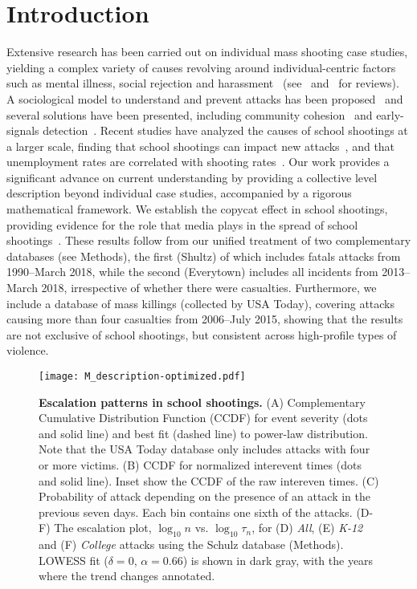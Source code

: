 \section*{Introduction}
Extensive research has been carried out on individual mass shooting
case studies, yielding a complex variety of causes revolving around
individual-centric factors such as mental illness, social rejection
and harassment~\cite{Newman2004,Flannery2013,Kimmel2003,Leary2003}
(see~\cite{Muschert2006} and~\cite{O2000} for reviews). 
A sociological model to understand and prevent attacks has been
proposed~\cite{Levin2009} and several solutions have been presented,
including community cohesion~\cite{Newman2004} and early-signals
detection~\cite{Wike2009, Borum2010}. 
Recent studies have analyzed the causes of school shootings at a larger scale, 
finding that school shootings can impact new attacks~\citet{towers2015a},
and that unemployment rates are correlated with shooting rates~\cite{Pah2017}.
Our work provides a significant advance on current understanding by
providing a collective level description beyond individual case
studies, accompanied by a rigorous mathematical framework. 
We establish the copycat effect in school shootings, 
providing evidence for the role that media plays in the spread of school shootings~\cite{Muschert2017}.
These results follow from our unified treatment of two complementary
databases (see Methods), the first (Shultz) of which includes fatals
attacks from 1990--March 2018, while the second (Everytown)
includes all incidents from 2013--March 2018, irrespective of
whether there were casualties. 
Furthermore, we include a database of mass killings (collected by USA
Today), covering attacks causing more than four casualties from
2006--July 2015, showing that the results are not exclusive of school
shootings, but consistent across high-profile types of violence. 

\begin{figure*}[htp!]
  \centering
  \texttt{[image: M\_description-optimized.pdf]}
  \caption{ 
    \textbf{Escalation patterns in school shootings.} 
    (A) Complementary Cumulative Distribution Function (CCDF) for
    event severity (dots and solid line) and best fit (dashed line) to
    power-law distribution. Note that the USA Today database only
    includes attacks with four or more victims.
    (B) CCDF for normalized interevent times (dots and solid
    line). Inset show the CCDF of the raw intereven times.
    (C) Probability of attack depending on the presence of an attack
    in the previous seven days. Each bin contains one sixth of the
    attacks.
    (D-F) The escalation plot, $\log_{10}{n}$ vs. $\log_{10}{\tau_n}$,
    for (D) \textit{All}, (E) \textit{K-12} and (F) \textit{College}
    attacks using the Schulz database (Methods).
    LOWESS fit ($\delta = 0$, $\alpha = 0.66$) is shown in dark gray,
    with the years where the trend changes annotated.
  }
  \label{fig:M_description}
\end{figure*}


